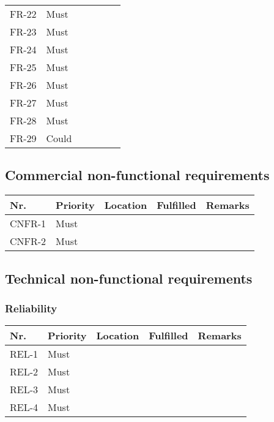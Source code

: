 \begin{table}
\begin{tabular}{lllll}
        FR-22 & Must     & ~        & ~         & ~       \\ 
        FR-23 & Must     & ~        & ~         & ~       \\ 
        FR-24 & Must     & ~        & ~         & ~       \\ 
        FR-25 & Must     & ~        & ~         & ~       \\ 
        FR-26 & Must     & ~        & ~         & ~       \\ 
        FR-27 & Must     & ~        & ~         & ~       \\ 
        FR-28 & Must     & ~        & ~         & ~       \\ 
        FR-29 & Could    & ~        & ~         & ~       \\

    \end{tabular}
\end{table}

\subsection{Commercial non-functional requirements}
\begin{table}
    \begin{tabular}{lllll}
    
        Nr.    & Priority & Location & Fulfilled & Remarks \\ \hline
        CNFR-1 & Must     & ~        & ~         & ~       \\ 
        CNFR-2 & Must     & ~        & ~         & ~       \\

    \end{tabular}
\end{table}

\subsection{Technical non-functional requirements}
\subsubsection{Reliability}
\begin{table}
    \begin{tabular}{lllll}
    
        Nr.   & Priority & Location & Fulfilled & Remarks \\ \hline
        REL-1 & Must     & ~        & ~         & ~       \\ 
        REL-2 & Must     & ~        & ~         & ~       \\ 
        REL-3 & Must     & ~        & ~         & ~       \\ 
        REL-4 & Must     & ~        & ~         & ~       \\

    \end{tabular}
\end{table}

